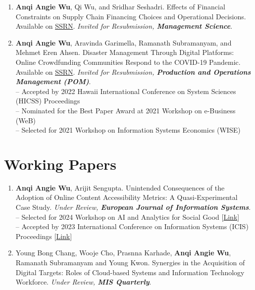 \documentclass[margin,line]{resume}
\begin{document}
\begin{resume}
\begin{enumerate}[topsep=0pt, leftmargin=*]
        \item \textbf{Anqi Angie Wu}, Qi Wu, and Sridhar Seshadri. Effects of Financial Constraints on Supply Chain Financing Choices and Operational Decisions. Available on \href{https://ssrn.com/abstract=4603080}{{SSRN}}. \textit{Invited for Resubmission, \textbf{Management Science}}. \\[-0.5em]  
       
         \item \textbf{Anqi Angie Wu}, Aravinda Garimella, Ramanath Subramanyam, and Mehmet Eren Ahsen. Disaster Management Through Digital Platforms: Online Crowdfunding Communities Respond to the COVID-19 Pandemic. Available on \href{https://papers.ssrn.com/abstract=3779438}{{SSRN}}. \textit{Invited for Resubmission, \textbf{Production and Operations Management (POM)}}. \\ 	     [0.3em]
         -- Accepted by 2022 Hawaii International Conference on System Sciences (HICSS) Proceedings\\
         -- Nominated for the Best Paper Award at 2021 Workshop on e-Business (WeB)\\
         -- Selected for 2021 Workshop on Information Systems Economics (WISE)

 	  \end{enumerate}   

\section{\mysidestyle Working Papers}  	  \begin{enumerate}[topsep=0pt, leftmargin=*]     
       \item \textbf{Anqi Angie Wu}, Arijit Sengupta. Unintended Consequences of the Adoption of Online Content Accessibility Metrics: A Quasi-Experimental Case Study. \textit{Under Review, \textbf{European Journal of Information Systems}}. 
       \\[0.3em]
       -- Selected for 2024 Workshop on AI and Analytics for Social Good [\href{https://www.rhsmith.umd.edu/departments/decision-operations-information-technologies/impact-workshop}{Link}]\\
       -- Accepted by 2023 International Conference on Information Systems (ICIS) Proceedings [\href{https://aisel.aisnet.org/icis2023/soc_impactIS/soc_impactIS/15/}{Link}]\\[-0.5em]
    \newpage 
       \item Young Bong Chang, Wooje Cho, Prasnna Karhade, \textbf{Anqi Angie Wu}, Ramanath Subramanyam and Young Kwon. Synergies in the Acquisition of Digital Targets: Roles of Cloud-based Systems and Information Technology Workforce. \textit{Under Review, \textbf{MIS Quarterly}}.\\[-0.5em]
           

\end{enumerate}
\end{resume}
\end{document}

